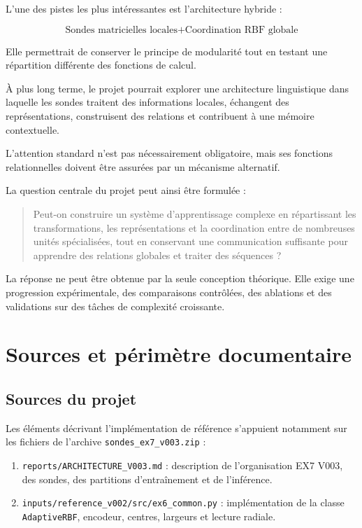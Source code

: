 \documentclass[11pt,a4paper]{report}
\begin{document}
L'une des pistes les plus intéressantes est l'architecture
hybride :

\[
\boxed{
\text{Sondes matricielles locales}
+
\text{Coordination RBF globale}
}
\]

Elle permettrait de conserver le principe de modularité
tout en testant une répartition différente des fonctions
de calcul.

À plus long terme, le projet pourrait explorer une architecture
linguistique dans laquelle les sondes traitent des informations
locales, échangent des représentations, construisent des
relations et contribuent à une mémoire contextuelle.

L'attention standard n'est pas nécessairement obligatoire,
mais ses fonctions relationnelles doivent être assurées
par un mécanisme alternatif.

La question centrale du projet peut ainsi être formulée :

\begin{quote}
Peut-on construire un système d'apprentissage complexe
en répartissant les transformations, les représentations
et la coordination entre de nombreuses unités spécialisées,
tout en conservant une communication suffisante pour
apprendre des relations globales et traiter des séquences ?
\end{quote}

La réponse ne peut être obtenue par la seule conception
théorique. Elle exige une progression expérimentale,
des comparaisons contrôlées, des ablations et des validations
sur des tâches de complexité croissante.

\appendix
\chapter{Sources et périmètre documentaire}

\section{Sources du projet}

Les éléments décrivant l'implémentation de référence
s'appuient notamment sur les fichiers de l'archive
\texttt{sondes\_ex7\_v003.zip} :

\begin{enumerate}
  \item
  \texttt{reports/ARCHITECTURE\_V003.md} :
  description de l'organisation EX7 V003, des sondes,
  des partitions d'entraînement et de l'inférence.

  \item
  \texttt{inputs/reference\_v002/src/ex6\_common.py} :
  implémentation de la classe \texttt{AdaptiveRBF},
  encodeur, centres, largeurs et lecture radiale.
\end{enumerate}
\end{document}
